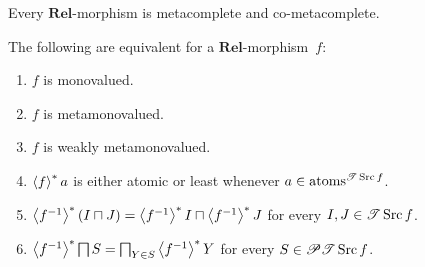 \begin{cor}
Every $\mathbf{Rel}$-morphism is metacomplete and co-metacomplete.\end{cor}
\begin{prop}
\label{rel-mono}The following are equivalent for a $\mathbf{Rel}$-morphism~$f$:
\begin{enumerate}
\item \label{rel-mono-mono}$f$ is monovalued.
\item \label{rel-mmv}$f$ is metamonovalued.
\item \label{rel-wmmv}$f$ is weakly metamonovalued.
\item \label{rel-mono-atom}$\left\langle f\right\rangle ^{\ast}a$ is either atomic or least whenever
$a\in\operatorname{atoms}^{\mathscr{T}\operatorname{Src} f}$.
\item \label{rel-mono-bin}$\left\langle f^{-1}\right\rangle ^{\ast}(I\sqcap J)=\left\langle f^{-1}\right\rangle ^{\ast}I\sqcap\left\langle f^{-1}\right\rangle ^{\ast}J$
for every $I,J\in\mathscr{T}\operatorname{Src} f$.
\item \label{rel-mono-meet}$\left\langle f^{-1}\right\rangle ^{\ast}\bigsqcap S=\bigsqcap_{Y\in S}\left\langle f^{-1}\right\rangle ^{\ast}Y$
for every $S\in\mathscr{P}\mathscr{T}\operatorname{Src} f$.
\end{enumerate}
\end{prop}
